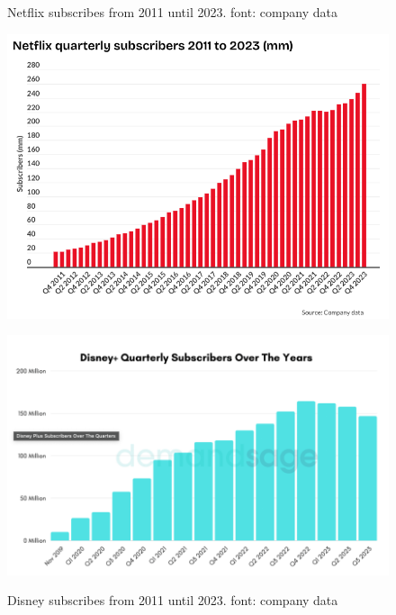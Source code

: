 \documentclass[12pt]{article}
\begin{document}
\begin{frame}{}
  \begin{figure}[h]
      \begin{minipage}[b]{0.45\linewidth}
          \centering
          \caption{Netflix subscribes from 2011 until 2023. font: company data}
          \label{fig:netflix_quarter}
          \includegraphics[width=1\textwidth]{assets/27.png}
          \label{fig:netflix_quarter}
      \end{minipage}
      \hspace{0.2cm}
      \begin{minipage}[b]{0.55\linewidth}
          \centering
          \caption{Disney subscribes from 2011 until 2023. font: company data}
          \label{fig:disney_quarter}
          \includegraphics[width=1\textwidth]{assets/28.png}
          \label{fig:b}
      \end{minipage}
  \end{figure}
\end{frame}
\end{document}
